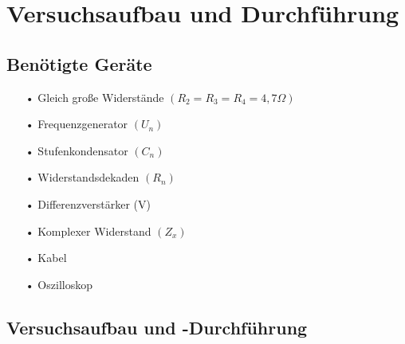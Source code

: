 \documentclass[fontsize=12pt]{scrartcl}
\begin{document}
\section{Versuchsaufbau und Durchführung}

\subsection{Benötigte Geräte}

\begin{itemize}
\item[•] Gleich große Widerstände $(R_{2}=R_{3}=R_{4}=4,7\Omega)$
\item[•] Frequenzgenerator $(U_{n})$
\item[•] Stufenkondensator $(C_{n})$
\item[•] Widerstandsdekaden $(R_{n})$
\item[•] Differenzverstärker (V)
\item[•] Komplexer Widerstand $(Z_{x})$
\item[•] Kabel
\item[•] Oszilloskop
\end{itemize}

\subsection{Versuchsaufbau und -Durchführung}
\end{document}
